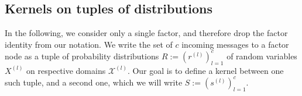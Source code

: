 \documentclass[english]{article}
\theoremstyle{plain}
\theoremstyle{plain}
\newcommand{\factor}{f}				%
\newcommand{\outV}{V}                         %
\newcommand{\approxMsg}[3]{M_{#1 \rightarrow #2}^{#3}}			%
\newcommand{\uncertaintyMsg}[3]{{\mathfrak V}_{#1 \rightarrow #2}^{#3}}			%
\newcommand{\secref}[1]{Section~\ref{#1}}
\begin{document}
%
%
%


\subsection{Kernels on tuples of distributions}\label{sec:kernelsOnDistributions}

In the following, we consider only a single factor, and therefore drop the factor identity from our notation. We write the set of $c$ incoming messages to a factor node as a tuple of
probability distributions %
$R:=(r^{(l)})_{l=1}^c$ of random variables $X^{(l)}$ on respective  domains $\mathcal{X}^{(l)}$.
Our goal is to define a kernel between one such tuple, and a second one,
which we will write %
$S:=(s^{(l)})_{l=1}^c$.
\end{document}

